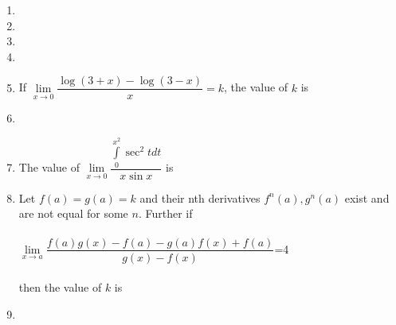 \documentclass[journal,12pt,twocolumn]{IEEEtran}
\begin{document}
\begin{enumerate}
\item {} \item[~] \item[~]
\begin{itemize}
\end{itemize}\item[~]

\item If $\lim\limits_{x \to 0}\dfrac{\log(3+x)-\log(3-x)}{x}=k$, the value of $k$ is
\begin{itemize}
\end{itemize} \item[~]

\item The value of $\lim\limits_{x \to 0}\dfrac{\int\limits_0^{x^2}\sec^2tdt}{x\sin x}$ is
\begin{itemize}
\end{itemize}

\item Let $f(a)=g(a)=k$ and their nth derivatives $f^n(a),g^n(a)$ exist and are not equal for some $n$. Further if \\ \\
$\lim\limits_{x \to a}\dfrac{f(a)g(x)-f(a)-g(a)f(x)+f(a)}{g(x)-f(x)}$=4 \\ \\ then the value of $k$ is
\begin{itemize}
\end{itemize}\item[~]


\end{enumerate}
\end{document}
